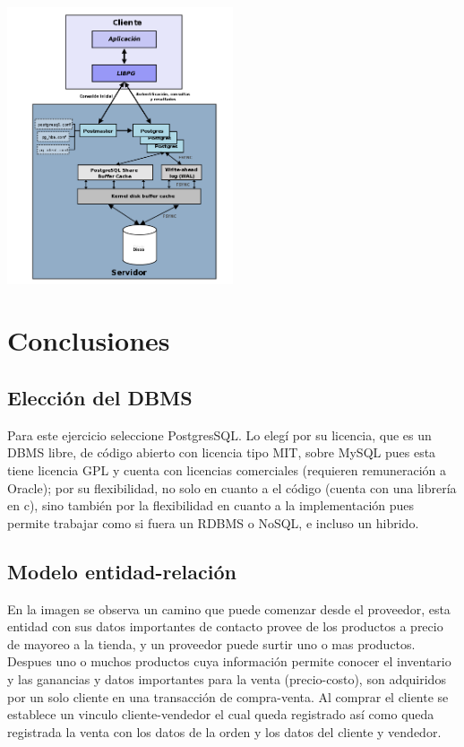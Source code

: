 \documentclass[spanish,12pt,letterpapper]{article}
\begin{document}
	   \begin{center}
	   \includegraphics[width=0.5\textwidth]{./arqpq}~\\[1cm]
	   \end{center}	
	   
	   
\section{Conclusiones}

\subsection{Elección del DBMS}
Para este ejercicio seleccione PostgresSQL. Lo elegí por su licencia, que es un DBMS libre, de código abierto con licencia tipo MIT, sobre MySQL pues esta tiene licencia GPL y cuenta con licencias comerciales (requieren remuneración a Oracle); por su flexibilidad, no solo en cuanto a el código (cuenta con una librería en c), sino también por la flexibilidad en cuanto a la implementación pues permite trabajar como si fuera un RDBMS o NoSQL, e incluso un hibrido.\\

\subsection{Modelo entidad-relación}
En la imagen se observa un camino que puede comenzar desde el proveedor, esta entidad con sus datos importantes de contacto provee de los productos a precio de mayoreo a la tienda, y un proveedor puede surtir uno o mas productos. Despues uno o muchos productos cuya información permite conocer el inventario y las ganancias y datos importantes para la venta (precio-costo), son adquiridos por un solo cliente en una transacción de compra-venta. Al comprar el cliente se establece un vinculo cliente-vendedor el cual queda registrado así como queda registrada la venta con los datos de la orden y los datos del cliente y vendedor.
\end{document}
